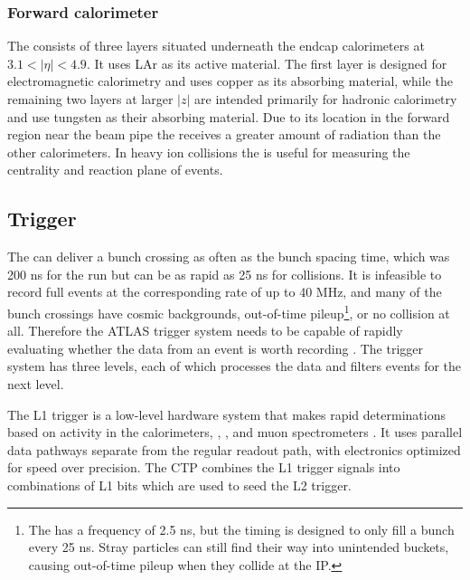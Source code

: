 \subsubsection{Forward calorimeter}
The \fcal consists of three layers situated underneath the endcap calorimeters at $3.1 < |\eta| < 4.9$.
It uses \ac{LAr} as its active material.
The first layer is designed for electromagnetic calorimetry and uses copper as its absorbing material, while the remaining two layers at larger $|z|$ are intended primarily for hadronic calorimetry and use tungsten as their absorbing material.
Due to its location in the forward region near the beam pipe the \fcal receives a greater amount of radiation than the other calorimeters.
In heavy ion collisions the \fcal is useful for measuring the centrality and reaction plane of events.

\subsection{Trigger}
\label{subsec:atlas_trigger} %

The \lhc can deliver a bunch crossing as often as the bunch spacing time, which was 200 ns for the \pPb run but can be as rapid as 25 ns for \pp collisions.
It is infeasible to record full events at the corresponding rate of up to 40 MHz, and many of the bunch crossings have cosmic backgrounds, out-of-time pileup\footnote{The \lhc \rf has a frequency of 2.5 ns, but the timing is designed to only fill a bunch every 25 ns. Stray particles can still find their way into unintended \rf buckets, causing out-of-time pileup when they collide at the \ac{IP}.}, or no collision at all.
Therefore the ATLAS trigger system needs to be capable of rapidly evaluating whether the data from an event is worth recording \cite{Aad:2012xs}. %
The trigger system has three levels, each of which processes the data and filters events for the next level.

The \ac{L1} trigger is a low-level hardware system that makes rapid determinations based on activity in the calorimeters, \mbts, \zdc, and muon spectrometers \cite{ATLAS:1998ad}.
It uses parallel data pathways separate from the regular readout path, with electronics optimized for speed over precision.
The \ac{CTP} combines the \ac{L1} trigger signals into combinations of \ac{L1} bits which are used to seed the \ac{L2} trigger.

